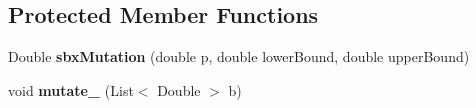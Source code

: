 \subsection*{Protected Member Functions}
\begin{DoxyCompactItemize}
\item 
\hypertarget{classcom_1_1msu_1_1moo_1_1operators_1_1mutation_1_1RealMutation_ab8d3fd3eed25e69ce58c55abc5919ed1}{Double {\bfseries sbx\-Mutation} (double p, double lower\-Bound, double upper\-Bound)}\label{classcom_1_1msu_1_1moo_1_1operators_1_1mutation_1_1RealMutation_ab8d3fd3eed25e69ce58c55abc5919ed1}

\item 
\hypertarget{classcom_1_1msu_1_1moo_1_1operators_1_1mutation_1_1RealMutation_a903b6389a21a1804977983a006b8281f}{void {\bfseries mutate\-\_\-} (List$<$ Double $>$ b)}\label{classcom_1_1msu_1_1moo_1_1operators_1_1mutation_1_1RealMutation_a903b6389a21a1804977983a006b8281f}

\end{DoxyCompactItemize}
